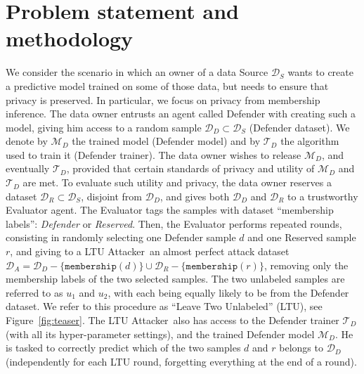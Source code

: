 \documentclass[letterpaper]{article}
\newcommand{\sminus}{-}
\newcommand{\oracle}{LTU Attacker~}
\begin{document}

\section{Problem statement and methodology}

We consider the scenario in which an owner of a data Source $\mathcal{D}_S$
wants to create a predictive model trained on some of those data, but needs to ensure that privacy is preserved. In particular, we focus on privacy from membership inference. 
The data owner entrusts an agent called Defender with creating such a model, giving him access to a random sample $\mathcal{D}_D \subset \mathcal{D}_S$ (Defender dataset). 
We denote by  $\mathcal{M}_D$ the trained model (Defender model) and by $\mathcal{T}_D$ the algorithm used to train it (Defender trainer). 
The data owner wishes to release $\mathcal{M}_D$, and eventually $\mathcal{T}_D$, provided that certain standards of privacy and utility of $\mathcal{M}_D$ and $\mathcal{T}_D$ are met. 
To evaluate such utility and privacy, the data owner reserves a dataset $\mathcal{D}_R \subset \mathcal{D}_S$, disjoint from $\mathcal{D}_D$, and gives both $\mathcal{D}_D$ and $\mathcal{D}_R$ to a trustworthy Evaluator agent. 
The Evaluator tags the samples with dataset ``membership labels'': {\em Defender} or {\em Reserved}. 
Then, the Evaluator performs repeated rounds, consisting in randomly selecting one Defender sample $d$ and one Reserved sample $r$,
and giving to a \oracle an almost perfect attack dataset $\mathcal{D}_A=\mathcal{D}_D\sminus\{\texttt{membership}(d)\} \cup \mathcal{D}_R\sminus\{\texttt{membership}(r)\}$, removing only the membership labels of the two selected samples. The two unlabeled samples are referred to as $u_1$ and $u_2$, with each being equally likely to be from the Defender dataset.
We refer to this procedure as  ``Leave Two Unlabeled'' (LTU), see Figure~\ref{fig:teaser}. The \oracle also has access to the Defender trainer $\mathcal{T}_D$ (with all its hyper-parameter settings), and the trained Defender model $\mathcal{M}_D$. He is tasked to correctly predict which of the two samples $d$ and $r$ belongs to $\mathcal{D}_D$ (independently for each LTU round, forgetting everything at the end of a round). 
\end{document}
